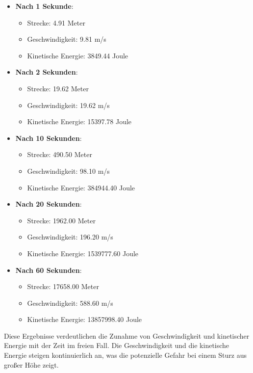 \documentclass{vorlage-design-main}
\begin{document}
\begin{itemize}

\item
  \textbf{Nach 1 Sekunde}:

  \begin{itemize}
  
  \item
    Strecke: 4.91 Meter
  \item
    Geschwindigkeit: 9.81 m/s
  \item
    Kinetische Energie: 3849.44 Joule
  \end{itemize}
\item
  \textbf{Nach 2 Sekunden}:

  \begin{itemize}
  
  \item
    Strecke: 19.62 Meter
  \item
    Geschwindigkeit: 19.62 m/s
  \item
    Kinetische Energie: 15397.78 Joule
  \end{itemize}
\item
  \textbf{Nach 10 Sekunden}:

  \begin{itemize}
  
  \item
    Strecke: 490.50 Meter
  \item
    Geschwindigkeit: 98.10 m/s
  \item
    Kinetische Energie: 384944.40 Joule
  \end{itemize}
\item
  \textbf{Nach 20 Sekunden}:

  \begin{itemize}
  
  \item
    Strecke: 1962.00 Meter
  \item
    Geschwindigkeit: 196.20 m/s
  \item
    Kinetische Energie: 1539777.60 Joule
  \end{itemize}
\item
  \textbf{Nach 60 Sekunden}:

  \begin{itemize}
  
  \item
    Strecke: 17658.00 Meter
  \item
    Geschwindigkeit: 588.60 m/s
  \item
    Kinetische Energie: 13857998.40 Joule
  \end{itemize}
\end{itemize}

Diese Ergebnisse verdeutlichen die Zunahme von Geschwindigkeit und
kinetischer Energie mit der Zeit im freien Fall. Die Geschwindigkeit und
die kinetische Energie steigen kontinuierlich an, was die potenzielle
Gefahr bei einem Sturz aus großer Höhe zeigt. %


\clearpage
\printbibliography
\end{document}
